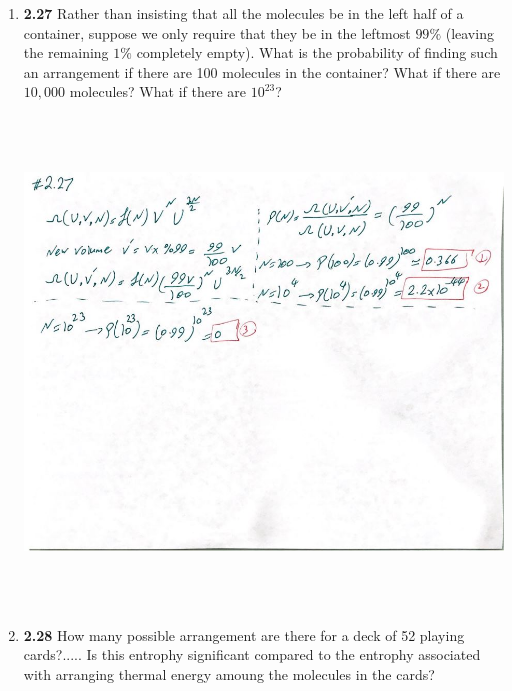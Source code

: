 \documentclass[fleqn]{article}
\begin{document}
  \begin{enumerate}
    \item \textbf{2.27} Rather than insisting that all the molecules be in the left half of a container, suppose we only require 
    that they be in the leftmost $99\%$ (leaving the remaining $1\%$ completely empty). What is the probability of finding such an
    arrangement if there are 100 molecules in the container? What if there are $10,000$ molecules? What if there are $10^{23}$?

    \begin{center}
      \includegraphics[height=13cm, width=14cm]{1.JPG}
    \end{center}

    \pagebreak

    \item \textbf{2.28} How many possible arrangement are there for a deck of 52 playing cards?..... Is this entrophy significant
    compared to the entrophy associated with arranging thermal energy amoung the molecules in the cards?


\end{enumerate}
\end{document}
